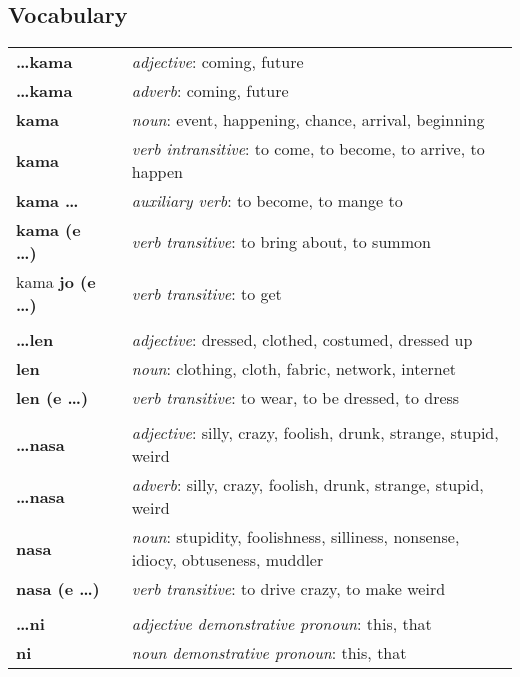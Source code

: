 \subsection*{Vocabulary}
\begin{supertabular}{p{2,5cm}|ll}
\textbf{\dots kama} && \textit{adjective}: coming, future \\ %
\textbf{\dots kama} && \textit{adverb}: coming, future \\ %
\textbf{kama} && \textit{noun}: event, happening, chance, arrival, beginning \\ %
\textbf{kama} && \textit{verb intransitive}: to come, to become, to arrive, to happen \\ %
\textbf{kama \dots} && \textit{auxiliary verb}: to become, to mange to \\ %
\textbf{kama (e \dots)} && \textit{verb transitive}: to bring about, to summon \\ %
kama \textbf{jo (e \dots)} && \textit{verb transitive}: to get \\ %
 && \\ %
\textbf{\dots len} && \textit{adjective}: dressed, clothed, costumed, dressed up \\ %
\textbf{len} && \textit{noun}: clothing, cloth, fabric, network, internet \\ %
\textbf{len (e \dots)} && \textit{verb transitive}: to wear, to be dressed, to dress \\ %
 && \\ %
\textbf{\dots nasa} && \textit{adjective}: silly, crazy, foolish, drunk, strange, stupid, weird \\ %
\textbf{\dots nasa} && \textit{adverb}: silly, crazy, foolish, drunk, strange, stupid, weird \\ %
\textbf{nasa} && \textit{noun}: stupidity, foolishness, silliness, nonsense, idiocy, obtuseness, muddler \\ %
\textbf{nasa (e \dots)} && \textit{verb transitive}: to drive crazy, to make weird \\ %
 && \\ %
\textbf{\dots ni} && \textit{adjective demonstrative pronoun}: this, that \\ %
\textbf{ni} && \textit{noun demonstrative pronoun}: this, that \\ %

\end{supertabular}
